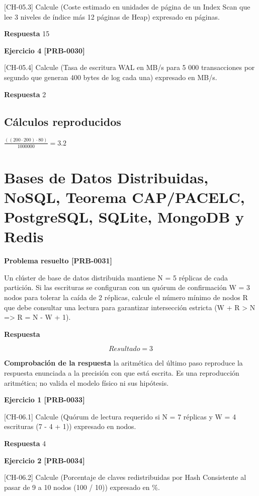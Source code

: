 \documentclass{book}
\begin{document}
[CH-05.3] Calcule (Coste estimado en unidades de página de un Index Scan que lee 3 niveles de índice más 12 páginas de Heap) expresado en páginas.

\noindent\textbf{Respuesta} 15

\noindent\textbf{Ejercicio 4 [PRB-0030]}

[CH-05.4] Calcule (Tasa de escritura WAL en MB/s para 5 000 transacciones por segundo que generan 400 bytes de log cada una) expresado en MB/s.

\noindent\textbf{Respuesta} 2

\subsection*{Cálculos reproducidos}

\(\frac{\left(\left(200\cdot 200\right)\cdot 80\right)}{1000000} = 3.2\)

\section{Bases de Datos Distribuidas, NoSQL, Teorema CAP/PACELC, PostgreSQL, SQLite, MongoDB y Redis}

\noindent\textbf{Problema resuelto [PRB-0031]}

Un clúster de base de datos distribuida mantiene N = 5 réplicas de cada partición. Si las escrituras se configuran con un quórum de confirmación W = 3 nodos para tolerar la caída de 2 réplicas, calcule el número mínimo de nodos R que debe consultar una lectura para garantizar intersección estricta (W + R > N => R = N - W + 1).

\noindent\textbf{Respuesta}

\[
Resultado = 3
\]

\noindent\textbf{Comprobación de la respuesta} la aritmética del último paso reproduce la respuesta enunciada a la precisión con que está escrita. Es una reproducción aritmética; no valida el modelo físico ni sus hipótesis.

\noindent\textbf{Ejercicio 1 [PRB-0033]}

[CH-06.1] Calcule (Quórum de lectura requerido si N = 7 réplicas y W = 4 escrituras (7 - 4 + 1)) expresado en nodos.

\noindent\textbf{Respuesta} 4

\noindent\textbf{Ejercicio 2 [PRB-0034]}

[CH-06.2] Calcule (Porcentaje de claves redistribuidas por Hash Consistente al pasar de 9 a 10 nodos (100 / 10)) expresado en \%.
\end{document}
